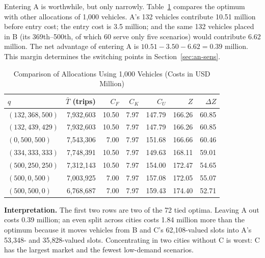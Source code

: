 \documentclass[10pt,a4paper]{article}
\begin{document}
Entering A is worthwhile, but only narrowly. Table~\ref{tab:an-plans} compares the optimum with other allocations of 1{,}000 vehicles.
A's 132 vehicles contribute 10.51 million before entry cost; the entry cost is 3.5 million; and the same 132 vehicles placed in B (its 369th--500th, of which 60 serve only five scenarios) would contribute 6.62 million. The net advantage of entering A is $10.51-3.50-6.62=0.39$ million.
This margin determines the switching points in Section~\ref{sec:an-sens}.
\begin{table}[H]
\centering\small
\caption{Comparison of Allocations Using 1{,}000 Vehicles (Costs in USD Million)}\label{tab:an-plans}
\begin{tabular}{lrrrrrr}
\toprule
$q$ & $\bar T$ (trips) & $C_F$ & $C_K$ & $C_U$ & $Z$ & $\Delta Z$\\\midrule
$(132,368,500)$ & 7,932,603 & 10.50 & 7.97 & 147.79 & 166.26 & 60.85\\
$(132,439,429)$ & 7,932,603 & 10.50 & 7.97 & 147.79 & 166.26 & 60.85\\
$(0,500,500)$ & 7,543,306 & 7.00 & 7.97 & 151.68 & 166.66 & 60.46\\
$(334,333,333)$ & 7,748,391 & 10.50 & 7.97 & 149.63 & 168.11 & 59.01\\
$(500,250,250)$ & 7,312,143 & 10.50 & 7.97 & 154.00 & 172.47 & 54.65\\
$(500,0,500)$ & 7,003,925 & 7.00 & 7.97 & 157.08 & 172.05 & 55.07\\
$(500,500,0)$ & 6,768,687 & 7.00 & 7.97 & 159.43 & 174.40 & 52.71\\
\bottomrule
\end{tabular}
\end{table}
\textbf{Interpretation.} The first two rows are two of the 72 tied optima. Leaving A out costs 0.39 million; an even split across cities costs 1.84 million more than the optimum because it moves vehicles from B and C's 62{,}108-valued slots into A's 53{,}348- and 35{,}828-valued slots.
Concentrating in two cities without C is worst: C has the largest market and the fewest low-demand scenarios.

\FloatBarrier
\end{document}
